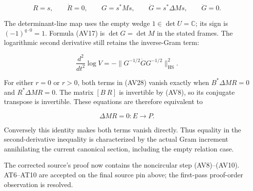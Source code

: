 \documentclass{article}
\begin{document}
\[
R=s,\qquad \dot R=0,\qquad
G=s^*Ms,\qquad \dot G=s^*\Delta M s,\qquad \ddot G=0.
\tag{AV30}
\]

The determinant-line map uses the empty wedge \(1\in\det U=\mathbb C\); its sign is \((-1)^{q\cdot0}=1\). Formula (AV17) is \(\det G=\det M\) in the stated frames. The logarithmic second derivative still retains the inverse-Gram term:

\[
\frac{d^2}{dt^2}\log V
=-\|G^{-1/2}\dot G G^{-1/2}\|_{\mathrm{HS}}^2.
\tag{AV31}
\]

For either \(r=0\) or \(r>0\), both terms in (AV28) vanish exactly when \(B^*\Delta M R=0\) and \(R^*\Delta M R=0\). The matrix \([B\ R]\) is invertible by (AV8), so its conjugate transpose is invertible. These equations are therefore equivalent to

\[
\Delta M R=0:E\longrightarrow P.
\tag{AV32}
\]

Conversely this identity makes both terms vanish directly. Thus equality in the second-derivative inequality is characterized by the actual Gram increment annihilating the current canonical section, including the empty relation case.

The corrected source's proof now contains the noncircular step (AV8)--(AV10). AT6--AT10 are accepted on the final source pin above; the first-pass proof-order observation is resolved.

\endgroup
\end{document}
